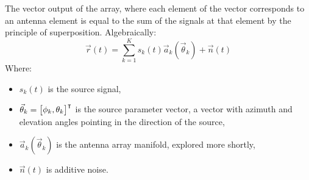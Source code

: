 The vector output of the array, where each element of the vector corresponds to an antenna element is equal to the sum of the signals at that element by the principle of superposition. Algebraically:
\begin{equation}
  \vec{r}(t) = \sum_{k=1}^{K} s_k(t)\vec{a}_k(\vec{\theta}_k) + \vec{n}(t)
\end{equation}
Where:
\begin{itemize}
  \item \(s_k(t)\) is the source signal,
  \item \(\vec{\theta}_k = \begin{bmatrix} \phi_k, \theta_k \end{bmatrix}^\intercal\) is the source parameter vector, a vector with azimuth and elevation angles pointing in the direction of the source,
  \item \(\vec{a}_k(\vec{\theta}_k)\) is the antenna array manifold, explored more shortly,
  \item \(\vec{n}(t)\) is additive noise.
\end{itemize}

